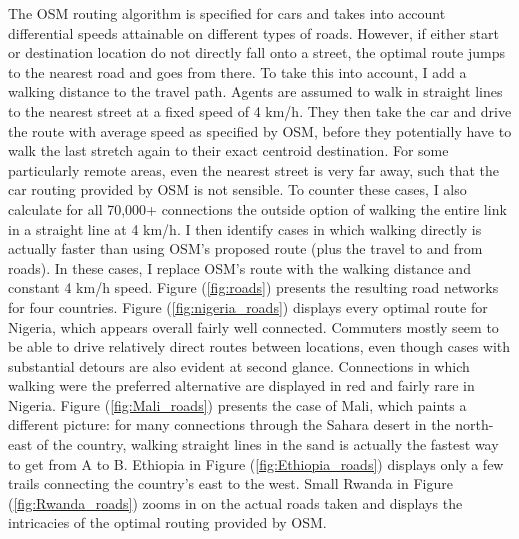 \documentclass[11pt, oneside]{article}   	%
\let\oldref\ref
\renewcommand{\ref}[1]{(\oldref{#1})}
\begin{document}
The OSM routing algorithm is specified for cars and takes into account differential speeds attainable on different types of roads. However, if either start or destination location do not directly fall onto a street, the optimal route jumps to the nearest road and goes from there. To take this into account, I add a walking distance to the travel path. Agents are assumed to walk in straight lines to the nearest street at a fixed speed of 4 km/h. They then take the car and drive the route with average speed as specified by OSM, before they potentially have to walk the last stretch again to their exact centroid destination. For some particularly remote areas, even the nearest street is very far away, such that the car routing provided by OSM is not sensible. To counter these cases, I also calculate for all 70,000+ connections the outside option of walking the entire link in a straight line at 4 km/h. I then identify cases in which walking directly is actually faster than using OSM's proposed route (plus the travel to and from roads). In these cases, I replace OSM's route with the walking distance and constant 4 km/h speed. Figure \ref{fig:roads} presents the resulting road networks for four countries. Figure \ref{fig:nigeria_roads} displays every optimal route for Nigeria, which appears overall fairly well connected. Commuters mostly seem to be able to drive relatively direct routes between locations, even though cases with substantial detours are also evident at second glance. Connections in which walking were the preferred alternative are displayed in red and fairly rare in Nigeria. Figure \ref{fig:Mali_roads} presents the case of Mali, which paints a different picture: for many connections through the Sahara desert in the north-east of the country, walking straight lines in the sand is actually the fastest way to get from A to B. Ethiopia in Figure \ref{fig:Ethiopia_roads} displays only a few trails connecting the country's east to the west. Small Rwanda in Figure \ref{fig:Rwanda_roads} zooms in on the actual roads taken and displays the intricacies of the optimal routing provided by OSM.
\end{document}
